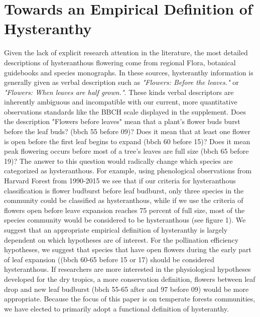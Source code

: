 \documentclass{article}\usepackage[]{graphicx}\usepackage[]{color}
\begin{document}
\section*{Towards an Empirical Definition of Hysteranthy}
\indent Given the lack of explicit research attention in the literature, the most detailed descriptions of hysteranthous flowering come from regional Flora, botanical guidebooks and species monographs. In these sources, hysteranthy information is generally given as verbal description such as \textit{"Flowers: Before the leaves."} or \textit{"Flowers: When leaves are half grown."}. These kinds verbal descriptors are inherently ambiguous and incompatible with our current, more quantitative observations standards like the BBCH scale \citep{Finn2007} displayed in the supplement. Does the description "Flowers before leaves"  mean that a plant's flower buds burst before the leaf buds? (bbch 55 before 09)? Does it mean that at least one flower is open before the first leaf begins to expand (bbch 60 before 15)? Does it mean peak flowering occurs before most of a tree's leaves are full size (bbch 65 before 19)? The answer to this question would radically change which species are categorized as hysteranthous. For example, using phenological observations from Harvard Forest from 1990-2015 \citep{Okeefe} we see that if our criteria for hysteranthous classification is flower budburst before leaf budburst, only three species in the community could be classified as hysteranthous, while if we use the criteria of flowers open before leave expansion reaches 75 percent of full size, most of the species community would be considered to be hysteranthous (see figure 1).  We suggest that an appropriate empirical definition of hysteranthy is largely dependent on which hypotheses are of interest. For the pollination efficiency hypotheses, we suggest that species that have open flowers during the early part of leaf expansion ((bbch 60-65 before 15 or 17) should be considered hysteranthous. If researchers are more interested in the physiological hypotheses developed for the dry tropics, a more conservation definition, flowers between leaf drop and new leaf budburst (bbch 55-65 after and 97 before 09) would be more appropriate. Because the focus of this paper is on temperate forests communities, we have elected to primarily adopt a functional definition of hysteranthy.\\
\end{document}

